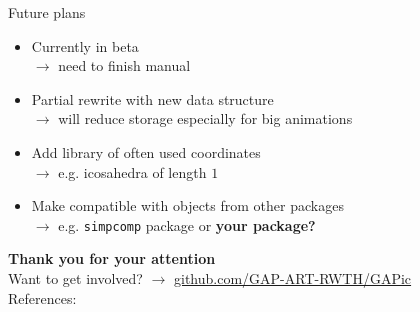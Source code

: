 \documentclass{beamer}
\numberwithin{equation}{aufgabe}
\begin{document}
\begin{frame}
    \begin{exampleblock}{Future plans}
        \begin{itemize}[label=-]
            \item Currently in beta\\
            $\xrightarrow{}$ need to finish manual \pause
            \item Partial rewrite with new data structure\\
            $\xrightarrow{}$ will reduce storage especially for big animations
            \item Add library of often used coordinates \\
            $\xrightarrow{}$ e.g. icosahedra of length $1$\cite{ico}\pause
            \item Make compatible with objects from other packages\\
            $\xrightarrow{}$ e.g. \texttt{simpcomp} package or \pause\textbf{your package?}
        \end{itemize}
    \end{exampleblock}
\end{frame}

\begin{frame}
    \textbf{\Large Thank you for your attention}\\ 
    \bigskip
    Want to get involved? $\xrightarrow{}$ \url{github.com/GAP-ART-RWTH/GAPic}\\
    \bigskip
    References:\\
    \printbibliography
\end{frame}
\end{document}
